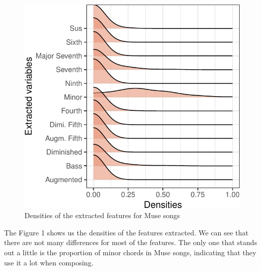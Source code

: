 \documentclass[]{article}
\begin{document}
\begin{figure}[H]

{\centering \includegraphics{assign_files/figure-latex/unnamed-chunk-4-1} 

}

\caption{Densities of the extracted features for Muse songs}\label{fig:unnamed-chunk-4}
\end{figure}

The Figure 1 shows us the densities of the features extracted. We can
see that there are not many differences for most of the features. The
only one that stands out a little is the proportion of minor chords in
Muse songs, indicating that they use it a lot when composing.
\end{document}
